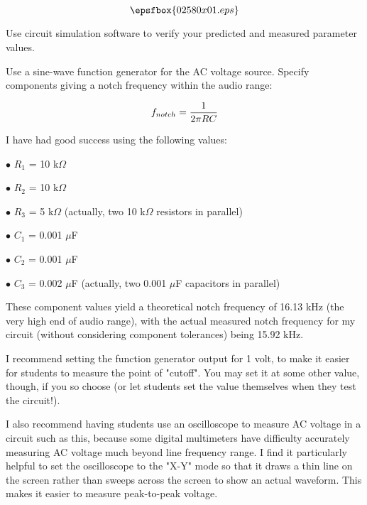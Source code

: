 

$$\epsfbox{02580x01.eps}$$

\vfil \eject






Use circuit simulation software to verify your predicted and measured parameter values.







Use a sine-wave function generator for the AC voltage source.  Specify components giving a notch frequency within the audio range:

$$f_{notch} = {1 \over {2 \pi R C}}$$

I have had good success using the following values:

\medskip
\item{$\bullet$} $R_1$ = 10 k$\Omega$
\item{$\bullet$} $R_2$ = 10 k$\Omega$
\item{$\bullet$} $R_3$ = 5 k$\Omega$ (actually, two 10 k$\Omega$ resistors in parallel)
\item{$\bullet$} $C_1$ = 0.001 $\mu$F
\item{$\bullet$} $C_2$ = 0.001 $\mu$F
\item{$\bullet$} $C_3$ = 0.002 $\mu$F (actually, two 0.001 $\mu$F capacitors in parallel)
\medskip

These component values yield a theoretical notch frequency of 16.13 kHz (the very high end of audio range), with the actual measured notch frequency for my circuit (without considering component tolerances) being 15.92 kHz.

I recommend setting the function generator output for 1 volt, to make it easier for students to measure the point of "cutoff".  You may set it at some other value, though, if you so choose (or let students set the value themselves when they test the circuit!).

I also recommend having students use an oscilloscope to measure AC voltage in a circuit such as this, because some digital multimeters have difficulty accurately measuring AC voltage much beyond line frequency range.  I find it particularly helpful to set the oscilloscope to the "X-Y" mode so that it draws a thin line on the screen rather than sweeps across the screen to show an actual waveform.  This makes it easier to measure peak-to-peak voltage.




